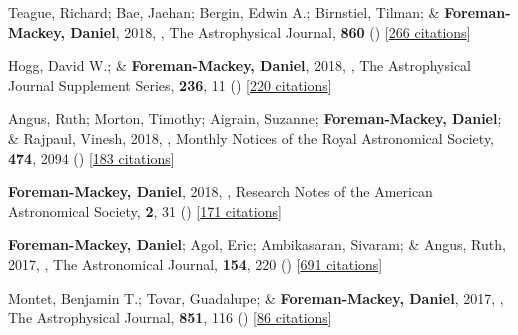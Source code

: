 \item[{\color{numcolor}\scriptsize35}] Teague, Richard; Bae, Jaehan; Bergin, Edwin A.; Birnstiel, Tilman; \& \textbf{Foreman-Mackey, Daniel}, 2018, , The Astrophysical Journal, \textbf{860} () [\href{https://ui.adsabs.harvard.edu/abs/2018ApJ...860L..12T}{266 citations}]

\item[{\color{numcolor}\scriptsize34}] Hogg, David W.; \& \textbf{Foreman-Mackey, Daniel}, 2018, , The Astrophysical Journal Supplement Series, \textbf{236}, 11 () [\href{https://ui.adsabs.harvard.edu/abs/2018ApJS..236...11H}{220 citations}]

\item[{\color{numcolor}\scriptsize33}] Angus, Ruth; Morton, Timothy; Aigrain, Suzanne; \textbf{Foreman-Mackey, Daniel}; \& Rajpaul, Vinesh, 2018, , Monthly Notices of the Royal Astronomical Society, \textbf{474}, 2094 () [\href{https://ui.adsabs.harvard.edu/abs/2018MNRAS.474.2094A}{183 citations}]

\item[{\color{numcolor}\scriptsize32}] \textbf{Foreman-Mackey, Daniel}, 2018, , Research Notes of the American Astronomical Society, \textbf{2}, 31 () [\href{https://ui.adsabs.harvard.edu/abs/2018RNAAS...2...31F}{171 citations}]

\item[{\color{numcolor}\scriptsize31}] \textbf{Foreman-Mackey, Daniel}; Agol, Eric; Ambikasaran, Sivaram; \& Angus, Ruth, 2017, , The Astronomical Journal, \textbf{154}, 220 () [\href{https://ui.adsabs.harvard.edu/abs/2017AJ....154..220F}{691 citations}]

\item[{\color{numcolor}\scriptsize30}] Montet, Benjamin T.; Tovar, Guadalupe; \& \textbf{Foreman-Mackey, Daniel}, 2017, , The Astrophysical Journal, \textbf{851}, 116 () [\href{https://ui.adsabs.harvard.edu/abs/2017ApJ...851..116M}{86 citations}]

